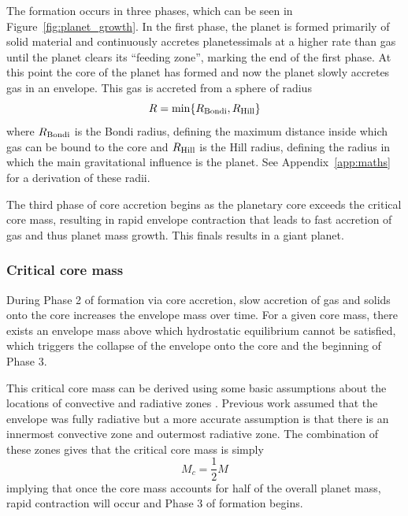 \documentclass[twocolumn]{aastex631}
\begin{document}
The formation occurs in three phases, which can be seen in Figure~\ref{fig:planet_growth}. In the first phase, the planet is formed primarily of solid material and continuously accretes planetessimals at a higher rate than gas until the planet clears its ``feeding zone'', marking the end of the first phase. At this point the core of the planet has formed and now the planet slowly accretes gas in an envelope. This gas is accreted from a sphere of radius \citep{Bodenheimer+2013}
\begin{equation}
    R = \min \{ R_{\rm Bondi}, R_{\rm Hill} \}
\end{equation}
where $R_{\rm Bondi}$ is the Bondi radius, defining the maximum distance inside which gas can be bound to the core and $R_{\rm Hill}$ is the Hill radius, defining the radius in which the main gravitational influence is the planet. See Appendix~\ref{app:maths} for a derivation of these radii.

The third phase of core accretion begins as the planetary core exceeds the critical core mass, resulting in rapid envelope contraction that leads to fast accretion of gas and thus planet mass growth. This finals results in a giant planet.

\subsubsection{Critical core mass}

During Phase 2 of formation via core accretion, slow accretion of gas and solids onto the core increases the envelope mass over time. For a given core mass, there exists an envelope mass above which hydrostatic equilibrium cannot be satisfied, which triggers the collapse of the envelope onto the core and the beginning of Phase 3.

This critical core mass can be derived using some basic assumptions about the locations of convective and radiative zones \citep{Stevenson+1982,Lissauer+2009}. Previous work assumed that the envelope was fully radiative but a more accurate assumption is that there is an innermost convective zone and outermost radiative zone. The combination of these zones gives that the critical core mass is simply
\begin{equation}
    M_{c} = \frac{1}{2} M
\end{equation}
implying that once the core mass accounts for half of the overall planet mass, rapid contraction will occur and Phase 3 of formation begins.
\end{document}
